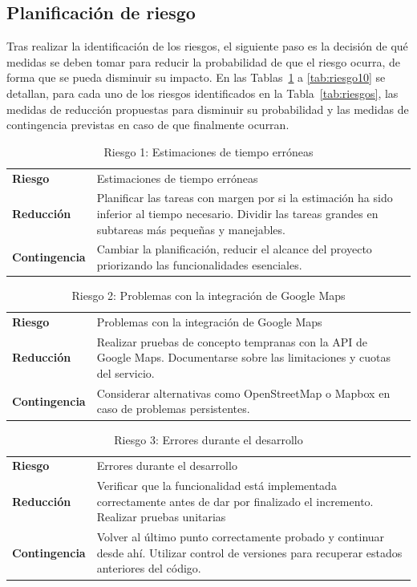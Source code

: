 \subsection{Planificación de riesgo}

Tras realizar la identificación de los riesgos, el siguiente paso es la decisión de qué medidas se deben tomar para reducir la probabilidad de que el riesgo ocurra, de forma que se pueda disminuir su impacto. En las Tablas~\ref{tab:riesgo1} a \ref{tab:riesgo10} se detallan, para cada uno de los riesgos identificados en la Tabla~\ref{tab:riesgos}, las medidas de reducción propuestas para disminuir su probabilidad y las medidas de contingencia previstas en caso de que finalmente ocurran.

\begin{table}[ht!]
\centering
\begin{tabular}{@{}p{3cm}p{10cm}@{}}
\textbf{Riesgo} & Estimaciones de tiempo erróneas \\[0.4em]
\textbf{Reducción} & Planificar las tareas con margen por si la estimación ha sido inferior al tiempo necesario. Dividir las tareas grandes en subtareas más pequeñas y manejables. \\[0.4em]
\textbf{Contingencia} & Cambiar la planificación, reducir el alcance del proyecto priorizando las funcionalidades esenciales.
\end{tabular}
\caption{Riesgo 1: Estimaciones de tiempo erróneas}
\label{tab:riesgo1}
\end{table}

\begin{table}[ht!]
\centering
\begin{tabular}{@{}p{3cm}p{10cm}@{}}
\textbf{Riesgo} & Problemas con la integración de Google Maps \\[0.4em]
\textbf{Reducción} & Realizar pruebas de concepto tempranas con la API de Google Maps. Documentarse sobre las limitaciones y cuotas del servicio. \\[0.4em]
\textbf{Contingencia} & Considerar alternativas como OpenStreetMap \cite{openstreetmap} o Mapbox en caso de problemas persistentes.
\end{tabular}
\caption{Riesgo 2: Problemas con la integración de Google Maps}
\label{tab:riesgo2}
\end{table}

\begin{table}[ht!]
\centering
\begin{tabular}{@{}p{3cm}p{10cm}@{}}
\textbf{Riesgo} & Errores durante el desarrollo \\[0.4em]
\textbf{Reducción} & Verificar que la funcionalidad está implementada correctamente antes de dar por finalizado el incremento. Realizar pruebas unitarias\footnotemark{Pruebas unitarias: pruebas que verifican el correcto funcionamiento de componentes individuales del código de forma aislada.} \\[0.4em]
\textbf{Contingencia} & Volver al último punto correctamente probado y continuar desde ahí. Utilizar control de versiones \cite{github} para recuperar estados anteriores del código.
\end{tabular}
\caption{Riesgo 3: Errores durante el desarrollo}
\label{tab:riesgo3}
\end{table}

